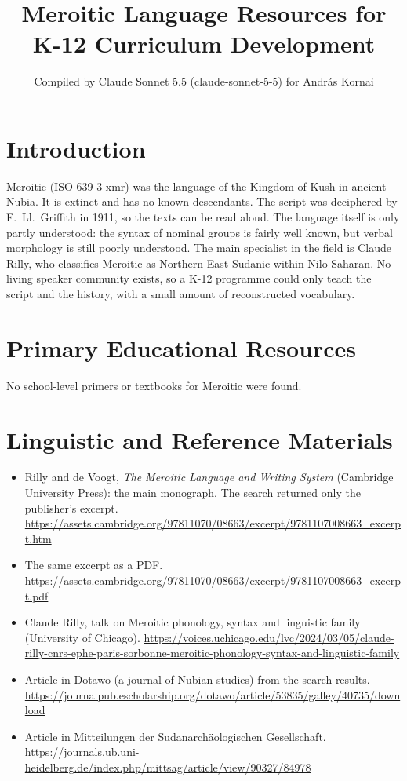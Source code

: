 \documentclass[12pt]{article}
\title{Meroitic Language Resources for K-12 Curriculum Development}
\author{Compiled by Claude Sonnet 5.5 (claude-sonnet-5-5) for Andr\'as Kornai}
\date{}
\begin{document}
\maketitle

\section{Introduction}
Meroitic (ISO 639-3 xmr) was the language of the Kingdom of Kush in ancient Nubia. It is extinct and has no known descendants. The script was deciphered by F.~Ll.~Griffith in 1911, so the texts can be read aloud. The language itself is only partly understood: the syntax of nominal groups is fairly well known, but verbal morphology is still poorly understood. The main specialist in the field is Claude Rilly, who classifies Meroitic as Northern East Sudanic within Nilo-Saharan. No living speaker community exists, so a K-12 programme could only teach the script and the history, with a small amount of reconstructed vocabulary.

\section{Primary Educational Resources}
No school-level primers or textbooks for Meroitic were found.

\section{Linguistic and Reference Materials}
\begin{itemize}
\item Rilly and de Voogt, \emph{The Meroitic Language and Writing System} (Cambridge University Press): the main monograph. The search returned only the publisher's excerpt. \url{https://assets.cambridge.org/97811070/08663/excerpt/9781107008663_excerpt.htm}
\item The same excerpt as a PDF. \url{https://assets.cambridge.org/97811070/08663/excerpt/9781107008663_excerpt.pdf}
\item Claude Rilly, talk on Meroitic phonology, syntax and linguistic family (University of Chicago). \url{https://voices.uchicago.edu/lvc/2024/03/05/claude-rilly-cnrs-ephe-paris-sorbonne-meroitic-phonology-syntax-and-linguistic-family}
\item Article in Dotawo (a journal of Nubian studies) from the search results. \url{https://journalpub.escholarship.org/dotawo/article/53835/galley/40735/download}
\item Article in Mitteilungen der Sudanarch\"aologischen Gesellschaft. \url{https://journals.ub.uni-heidelberg.de/index.php/mittsag/article/view/90327/84978}
\end{itemize}
\end{document}
